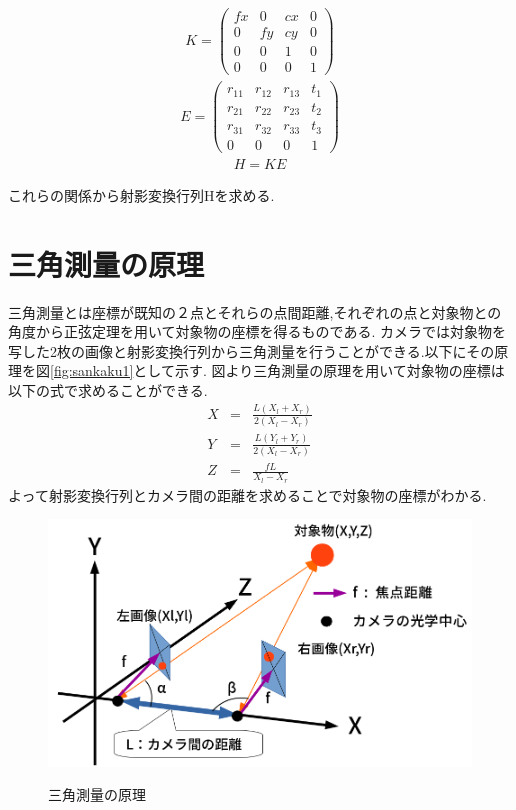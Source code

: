 \documentclass[12pt,oneside]{sotsuken_paper}
\begin{document}
\begin{eqnarray}
  K = \left(
    \begin{array}{cccc}
      fx & 0 & cx & 0\\
      0 & fy & cy & 0\\
      0 & 0 & 1 & 0\\
      0 & 0 & 0 & 1
    \end{array}
  \right)
\end{eqnarray}
\begin{eqnarray}
  E = \left(
    \begin{array}{cccc}
      r_{11} & r_{12} & r_{13} & t_1\\
      r_{21} & r_{22} & r_{23} & t_2\\
      r_{31} & r_{32} & r_{33} & t_3\\
      0 & 0 & 0 & 1
    \end{array}
  \right)
\end{eqnarray}
\begin{eqnarray}
  H = KE
\label{eqnarray:H}
\end{eqnarray}

これらの関係から射影変換行列Hを求める.
\section{三角測量の原理}
三角測量とは座標が既知の２点とそれらの点間距離,それぞれの点と対象物との角度から正弦定理を用いて対象物の座標を得るものである.
カメラでは対象物を写した2枚の画像と射影変換行列から三角測量を行うことができる.以下にその原理を図\ref{fig:sankaku1}として示す.
図より三角測量の原理を用いて対象物の座標は以下の式で求めることができる.
\begin{eqnarray}
	X&=&\frac{L(X_l+X_r)}{2(X_l-X_r)}\\
	Y&=&\frac{L(Y_l+Y_r)}{2(X_l-X_r)}\\
	Z&=&\frac{fL}{X_l-X_r}
\end{eqnarray}
よって射影変換行列とカメラ間の距離を求めることで対象物の座標がわかる.

\begin{figure}[htp]
 \begin{center}
  \includegraphics[width=120mm]{img/soft/sankaku2.png}
 　\caption{三角測量の原理}
  \label{fig:sankaku2}%
 \end{center}
\end{figure}
\end{document}
